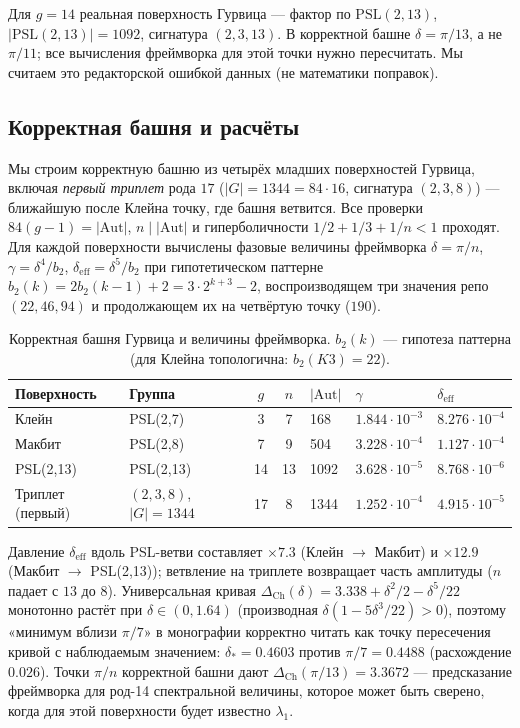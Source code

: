 \documentclass[11pt,a4paper]{article}
\begin{document}
\begin{findbox}
Для $g = 14$ реальная поверхность Гурвица --- фактор по $\mathrm{PSL}(2,13)$,
$|\mathrm{PSL}(2,13)| = 1092$, сигнатура $(2,3,13)$. В корректной башне
$\delta = \pi/13$, а не $\pi/11$; все вычисления фреймворка для этой точки
нужно пересчитать. Мы считаем это редакторской ошибкой данных (не математики
поправок).
\end{findbox}

\subsection{Корректная башня и расчёты}

Мы строим корректную башню из четырёх младших поверхностей Гурвица, включая
\emph{первый триплет} рода $17$ ($|G| = 1344 = 84\cdot 16$, сигнатура
$(2,3,8)$) --- ближайшую после Клейна точку, где башня ветвится. Все проверки
$84(g-1) = |\mathrm{Aut}|$, $n \mid |\mathrm{Aut}|$ и гиперболичности
$1/2 + 1/3 + 1/n < 1$ проходят. Для каждой поверхности вычислены фазовые
величины фреймворка $\delta = \pi/n$, $\gamma = \delta^4/b_2$,
$\delta_{\mathrm{eff}} = \delta^5/b_2$ при гипотетическом паттерне
$b_2(k) = 2b_2(k-1) + 2 = 3\cdot 2^{k+3} - 2$, воспроизводящем три значения
репо $(22, 46, 94)$ и продолжающем их на четвёртую точку ($190$).

\begin{table}[htbp]
\centering\small
\caption{Корректная башня Гурвица и величины фреймворка. $b_2(k)$ --- гипотеза
паттерна (для Клейна топологична: $b_2(K3) = 22$).}
\label{tab:tower}
\begin{tabular}{llcclll}
\toprule
Поверхность & Группа & $g$ & $n$ & $|\mathrm{Aut}|$ & $\gamma$ & $\delta_{\mathrm{eff}}$ \\
\midrule
Клейн & PSL(2,7) & 3 & 7 & 168 & $1.844\cdot10^{-3}$ & $8.276\cdot10^{-4}$ \\
Макбит & PSL(2,8) & 7 & 9 & 504 & $3.228\cdot10^{-4}$ & $1.127\cdot10^{-4}$ \\
PSL(2,13) & PSL(2,13) & 14 & 13 & 1092 & $3.628\cdot10^{-5}$ & $8.768\cdot10^{-6}$ \\
Триплет (первый) & $(2,3,8)$, $|G|=1344$ & 17 & 8 & 1344 & $1.252\cdot10^{-4}$ & $4.915\cdot10^{-5}$ \\
\bottomrule
\end{tabular}
\end{table}

Давление $\delta_{\mathrm{eff}}$ вдоль PSL-ветви составляет $\times 7.3$ (Клейн
$\to$ Макбит) и $\times 12.9$ (Макбит $\to$ PSL(2,13)); ветвление на триплете
возвращает часть амплитуды ($n$ падает с $13$ до $8$). Универсальная кривая
$\Delta_{\mathrm{Ch}}(\delta) = 3.338 + \delta^2/2 - \delta^5/22$ монотонно
растёт при $\delta \in (0, 1.64)$ (производная $\delta(1 - 5\delta^3/22) > 0$),
поэтому «минимум вблизи $\pi/7$» в монографии корректно читать как точку
пересечения кривой с наблюдаемым значением: $\delta_* = 0.4603$ против
$\pi/7 = 0.4488$ (расхождение $0.026$). Точки $\pi/n$ корректной башни дают
$\Delta_{\mathrm{Ch}}(\pi/13) = 3.3672$ --- предсказание фреймворка для род-14
спектральной величины, которое может быть сверено, когда для этой поверхности
будет известно $\lambda_1$.
\end{document}
